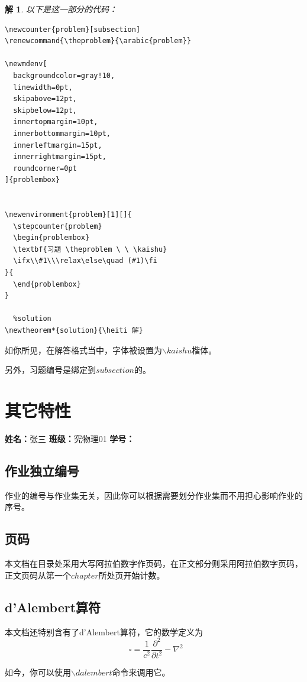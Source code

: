 \documentclass[UTF8,openany]{ctexbook}
\numberwithin{figure}{section}
\numberwithin{equation}{section}
\numberwithin{table}{section}
\newcommand{\dalembert}{\mathop{}\!\square}
\newcommand{\studentname}{张三}    %
\newcommand{\studentclass}{究物理01} %
\newcommand{\studentid}{31415926}  %
\newcommand{\assignment}[1]{
  \newpage
  \section{#1} 
  \vspace{0pt} 
  \begin{tcolorbox}[
    colback=white,
    colframe=white, 
    arc=2pt,
    halign=center,
    fontupper=\zihao{5}
  ]
  \textbf{姓名：}\kaishu \studentname\quad
  \textbf{\songti 班级：}\kaishu \studentclass\quad
  \textbf{\songti 学号：}\kaishu \studentid
  \end{tcolorbox}
  \vspace{0pt}
}
\newcounter{problem}[subsection]
\renewcommand{\theproblem}{\arabic{problem}}
\newtheorem*{solution}{\heiti 解}
\begin{document}
\begin{solution}
    以下是这一部分的代码：
    \begin{lstlisting}[title=\ ,frame=single]
  %problem
\newcounter{problem}[subsection]
\renewcommand{\theproblem}{\arabic{problem}}

\newmdenv[
  backgroundcolor=gray!10, 
  linewidth=0pt,
  skipabove=12pt,
  skipbelow=12pt, 
  innertopmargin=10pt,
  innerbottommargin=10pt,
  innerleftmargin=15pt,
  innerrightmargin=15pt,
  roundcorner=0pt
]{problembox} 


\newenvironment{problem}[1][]{
  \stepcounter{problem}
  \begin{problembox}
  \textbf{习题 \theproblem \ \ \kaishu}
  \ifx\\#1\\\relax\else\quad (#1)\fi
}{
  \end{problembox}
}

  %solution
\newtheorem*{solution}{\heiti 解}
    \end{lstlisting}
\end{solution}

如你所见，在解答格式当中，字体被设置为$\backslash kaishu$楷体。

另外，习题编号是绑定到$subsection$的。
\assignment{其它特性}
\subsection{作业独立编号}
作业的编号与作业集无关，因此你可以根据需要划分作业集而不用担心影响作业的序号。
\subsection{页码}
本文档在目录处采用大写阿拉伯数字作页码，在正文部分则采用阿拉伯数字页码，正文页码从第一个$chapter$所处页开始计数。
\subsection{d'Alembert算符}
本文档还特别含有了d'Alembert算符，它的数学定义为
\[\dalembert=\frac{1}{c^2}\frac{\partial^2}{\partial t^2}-\nabla^2\]

如今，你可以使用$\backslash dalembert$命令来调用它。
\end{document}
